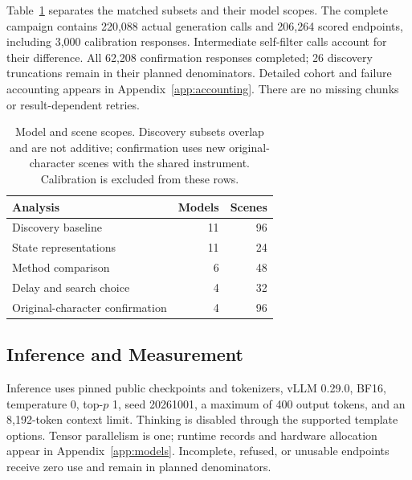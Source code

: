 Table~\ref{tab:cohorts} separates the matched subsets and their model scopes. The complete campaign contains 220,088 actual generation calls and 206,264 scored endpoints, including 3,000 calibration responses. Intermediate self-filter calls account for their difference. All 62,208 confirmation responses completed; 26 discovery truncations remain in their planned denominators. Detailed cohort and failure accounting appears in Appendix~\ref{app:accounting}. There are no missing chunks or result-dependent retries.

\begin{table}[t]
\centering\small
\begin{lrbox}{\OCtable}\begin{tabular}{@{}lrr@{}}
\toprule
Analysis & Models & Scenes\\
\midrule
Discovery baseline & 11 & 96\\
State representations & 11 & 24\\
Method comparison & 6 & 48\\
Delay and search choice & 4 & 32\\
Original-character confirmation & 4 & 96\\
\bottomrule
\end{tabular}\end{lrbox}
\ifdim\wd\OCtable>\linewidth\PackageError{access-paper}{Table tab:cohorts exceeds its column}{Revise the table layout.}\fi
\usebox{\OCtable}
\caption{Model and scene scopes. Discovery subsets overlap and are not additive; confirmation uses new original-character scenes with the shared instrument. Calibration is excluded from these rows.}
\label{tab:cohorts}
\end{table}

\subsection{Inference and Measurement}
\label{sec:measurement}

Inference uses pinned public checkpoints and tokenizers, vLLM 0.29.0, BF16, temperature 0, top-$p$ 1, seed 20261001, a maximum of 400 output tokens, and an 8,192-token context limit. Thinking is disabled through the supported template options. Tensor parallelism is one; runtime records and hardware allocation appear in Appendix~\ref{app:models}. Incomplete, refused, or unusable endpoints receive zero use and remain in planned denominators.

